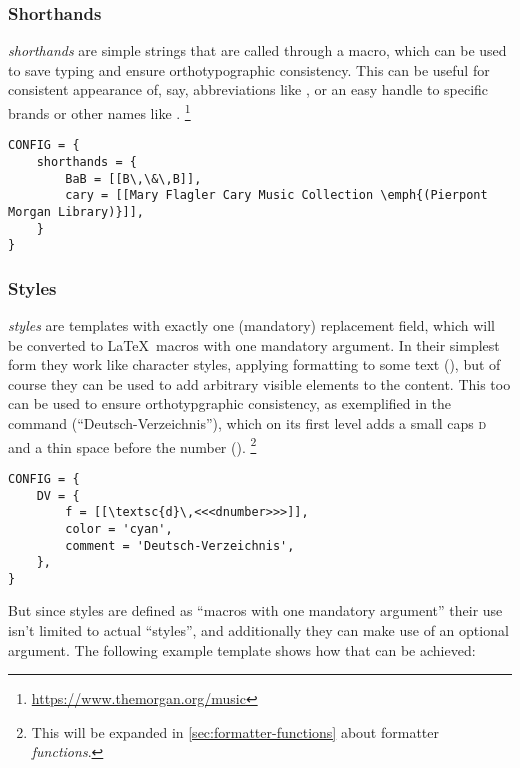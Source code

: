 \documentclass{scrartcl}
\begin{document}
\subsubsection{Shorthands}
\label{sec:shorthands}

\emph{shorthands} are simple strings that are called through a macro, which can
be used to save typing and ensure orthotypographic consistency.  This can be
useful for consistent appearance of, say, abbreviations like
, or an easy handle to specific brands or
other names like .%
\footnote{\url{https://www.themorgan.org/music}} %

\begin{verbatim}
CONFIG = {
    shorthands = {
        BaB = [[B\,\&\,B]],
        cary = [[Mary Flagler Cary Music Collection \emph{(Pierpont Morgan Library)}]],
    }
}
\end{verbatim}


\subsubsection{Styles}
\label{sec:styles}

\emph{styles} are templates with exactly one (mandatory) replacement field,
which will be converted to \LaTeX\ macros with one mandatory argument.  In their
simplest form they work like character styles, applying formatting to some text
(), but of course they can be used
to add arbitrary visible elements to the content.  This too can be used to
ensure orthotypgraphic consistency, as exemplified in the command 
(“Deutsch-Verzeichnis”), which on its first level adds a small caps \textsc{d}
and a thin space before the number
().%
\footnote{This will be expanded in \vref{sec:formatter-functions} about formatter
\emph{functions}.}

\begin{verbatim}
CONFIG = {
    DV = {
        f = [[\textsc{d}\,<<<dnumber>>>]],
        color = 'cyan',
        comment = 'Deutsch-Verzeichnis',
    },
}
\end{verbatim}

\noindent But since styles are defined as “macros with one mandatory argument”
their use isn't limited to actual “styles”, and additionally they can make use
of an optional argument.  The following example template shows how that can be
achieved:
\end{document}
